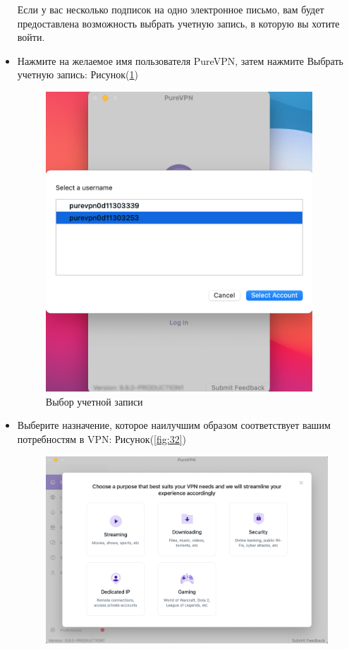 \begin{itemize}
Если у вас несколько подписок на одно электронное письмо, вам будет предоставлена возможность выбрать учетную запись, в которую вы хотите войти.
\item Нажмите на желаемое имя пользователя PureVPN, затем нажмите Выбрать учетную запись:  Рисунок(\ref{fig:31})
\begin{figure}[H]
\includegraphics[width=10cm]{26.png}
\centering
\caption{Выбор учетной записи}
\label{fig:31}
\end{figure}
\item Выберите назначение, которое наилучшим образом соответствует вашим потребностям в VPN:  Рисунок(\ref{fig:32})
\begin{figure}[H]
\includegraphics[width=14cm]{27.png}

\end{figure}
\end{itemize}

